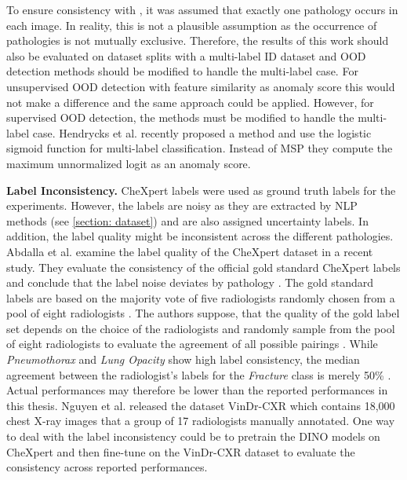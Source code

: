 To ensure consistency with \citep{Berger2021}, it was assumed that exactly one pathology occurs in each image.
In reality, this is not a plausible assumption as the occurrence of pathologies is not mutually exclusive.
Therefore, the results of this work should also be evaluated on dataset splits with a multi-label ID dataset and OOD detection methods should be modified to handle the multi-label case.
For unsupervised OOD detection with feature similarity as anomaly score this would not make a difference and the same approach could be applied.
However, for supervised OOD detection, the methods must be modified to handle the multi-label case.
Hendrycks et al. \citep{Hendrycks2022} recently proposed a method and use the logistic sigmoid function for multi-label classification.
Instead of MSP they compute the maximum unnormalized logit as an anomaly score.
\par
\textbf{Label Inconsistency.}
CheXpert labels were used as ground truth labels for the experiments.
However, the labels are noisy as they are extracted by NLP methods (see \ref{section: dataset}) and are also assigned uncertainty labels.
In addition, the label quality might be inconsistent across the different pathologies.
Abdalla et al. \citep{Abdalla2023} examine the label quality of the CheXpert dataset in a recent study.
They evaluate the consistency of the official gold standard CheXpert labels and conclude that the label noise deviates by pathology \citep{Abdalla2023}.
The gold standard labels are based on the majority vote of five radiologists randomly chosen from a pool of eight radiologists \citep{Irvin2019}.
The authors suppose, that the quality of the gold label set depends on the choice of the radiologists and randomly sample from the pool of eight radiologists to evaluate the agreement of all possible pairings \citep{Abdalla2023}. 
While \textit{Pneumothorax} and \textit{Lung Opacity} show high label consistency, the median agreement between the radiologist's labels for the \textit{Fracture} class is merely 50\% \citep{Abdalla2023}.
Actual performances may therefore be lower than the reported performances in this thesis.
Nguyen et al. \citep{Nguyen2022} released the dataset VinDr-CXR which contains 18,000 chest X-ray images that a group of 17 radiologists manually annotated.
One way to deal with the label inconsistency could be to pretrain the DINO models on CheXpert and then fine-tune on the VinDr-CXR dataset to evaluate the consistency across reported performances.
